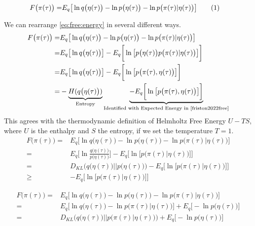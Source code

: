 \documentclass[]{article}
\newcommand\numberthis{\addtocounter{equation}{1}\tag{\theequation}}
\begin{document}
\begin{align*}
	F\big(\pi(\tau)\big) =& E_q\big[\ln q\big(\eta(\tau)\big) - \ln p\big(\eta(\tau)\big) - \ln p\big(\pi(\tau)\vert\eta(\tau)\big)\big] \numberthis \label{eq:free:energy}
\end{align*}

We can rearrange \eqref{eq:free:energy} in several different ways.
\begin{align*}
	F\big(\pi(\tau)\big) =& E_q\big[\ln q\big(\eta(\tau)\big) - \ln p\big(\eta(\tau)\big) - \ln p\big(\pi(\tau)\vert\eta(\tau)\big)\big]\\
	=& E_q\big[\ln q\big(\eta(\tau)\big)\big] - E_q \bigg[\ln \big[p\big(\eta(\tau)\big)  p\big(\pi(\tau)\vert\eta(\tau)\big)\big]\bigg]\\
	=& E_q\big[\ln q\big(\eta(\tau)\big)\big] - E_q \bigg[\ln \big[  p\big(\pi(\tau),\eta(\tau)\big)\big]\bigg]\\
	=&-\underbrace{H(q\big(\eta(\tau)\big))}_\text{Entropy}  \underbrace{- E_q \bigg[\ln \big[  p\big(\pi(\tau),\eta(\tau)\big)\big]\bigg]}_\text{Identified with Expected Energy in \cite{friston2022free}}
\end{align*}
This agrees with the thermodynamic definition of Helmholtz Free Energy $U-TS$, where $U$ is the enthalpy and $S$ the entropy, if we set the temperature $T=1$.
\begin{align*}
	F\big(\pi(\tau)\big) =& E_q\big[\ln q\big(\eta(\tau)\big) - \ln p\big(\eta(\tau)\big) - \ln p\big(\pi(\tau)\vert\eta(\tau)\big)\big]\\
	=& E_q\big[\ln \frac{q\big(\eta(\tau)\big)}{p\big(\eta(\tau)\big)}   \big] - E_q \bigg[\ln \big[  p\big(\pi(\tau)\vert\eta(\tau)\big)\big]\bigg]\\
	=& D_{KL}\big(q\big(\eta(\tau)\big)\vert\vert p\big(\eta(\tau)\big)\big)- E_q \bigg[\ln \big[  p\big(\pi(\tau)\vert\eta(\tau)\big)\big]\bigg]\\
	\ge&- E_q \bigg[\ln \big[  p\big(\pi(\tau)\vert\eta(\tau)\big)\big]\bigg]
\end{align*}

\begin{align*}
	F\big(\pi(\tau)\big) =& E_q\big[\ln q\big(\eta(\tau)\big) - \ln p\big(\eta(\tau)\big) - \ln p\big(\pi(\tau)\vert\eta(\tau)\big)\big]\\
	=& E_q\big[\ln q\big(\eta(\tau)\big)  - \ln p\big(\pi(\tau)\vert\eta(\tau)\big)\big] +  E_q\big[- \ln p\big(\eta(\tau)\big)\big]\\
	=& D_{KL}\big(q\big(\eta(\tau)\big)\vert\vert p\big(\pi(\tau)\vert\eta(\tau)\big)\big)+  E_q\big[- \ln p\big(\eta(\tau)\big)\big]
\end{align*}
\appendix

\printglossaries




\end{document}
